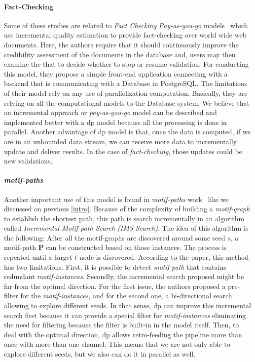 \paragraph{Fact-Checking} Some of these studies are related to \emph{Fact Checking Pay-as-you-go} models~\cite{factcatch} which use incremental quality estimation to provide fact-checking over world wide web documents.
Here, the authors require that it should continuously improve the credibility assessment of the documents in the database and, users may then examine the
that to decide whether to stop or resume validation.
For conducting this model, they propose a simple front-end application connecting with a backend that is communicating with a Database in PostgreSQL. 
The limitations of their model rely on any use of parallelization computation. Basically, they are relying on all the computational models to the Database system. 
We believe that an incremental approach or \emph{pay-as-you-go} model can be described and implemented better with a \acrshort{dp} model because all the processing is done in parallel. 
Another advantage of \acrshort{dp} model is that, once the data is computed, if we are in an unbounded data stream, we can receive more data to incrementally update and deliver results. 
In the case of \emph{fact-checking}, those updates could be new validations.

\paragraph{\emph{motif-paths}} Another important use of this model is found in \emph{motif-paths} work~\cite{Li2019MotifPA} like we discussed on previous \autoref{intro}.
Because of the complexity of building a \emph{motif-graph} to establish the shortest path, this path is search incrementally in an algorithm called \emph{Incremental Motif-path Search (IMS Search)}.
The idea of this algorithm is the following: After all the motif-graphs are discovered around some seed $s$, a motif-path $\mathbf{P}$ can be constructed based on those instances.
The process is repeated until a target $t$ node is discovered. According to the paper, this method has two limitations. First, it is possible to detect \emph{motif-path} that contains 
redundant \emph{motif-instances}. Secondly, the incremental search proposed might be far from the optimal direction. For the first issue, the authors proposed a pre-filter for the \emph{motif-instances},
and for the second one, a bi-directional search allowing to explore different seeds. 
In that sense, \acrshort{dp} can improve this incremental search first because it can provide a special filter for \emph{motif-instances} eliminating the need for filtering because the filter is built-in in the model itself.
Then, to deal with the optimal direction, \acrshort{dp} allows retro-feeding the pipeline more than once with more than one channel. This means that we are not only able to explore different seeds, but we also can do it in parallel as well.

